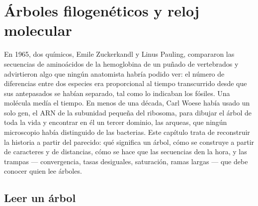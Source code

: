 \chapter{Árboles filogenéticos y reloj molecular}\label{ch:b2:phylogenetic-trees}

En 1965, dos químicos, Emile Zuckerkandl y Linus Pauling, compararon las
secuencias de aminoácidos de la hemoglobina de un puñado de vertebrados y
advirtieron algo que ningún anatomista habría podido ver: el número de
diferencias entre dos especies era proporcional al tiempo transcurrido
desde que sus antepasados se habían separado, tal como lo indicaban los
fósiles. Una molécula medía el tiempo. En menos de una década, Carl Woese
había usado un solo gen, el ARN de la subunidad pequeña del ribosoma, para
dibujar el árbol de toda la vida y encontrar en él un tercer dominio, las
arqueas, que ningún microscopio había distinguido de las bacterias. Este
capítulo trata de reconstruir la historia a partir del parecido: qué
significa un árbol, cómo se construye a partir de caracteres y de
distancias, cómo se hace que las secuencias den la hora, y las trampas ---
convergencia, tasas desiguales, saturación, ramas largas --- que debe
conocer quien lee árboles.

\section{Leer un árbol}

